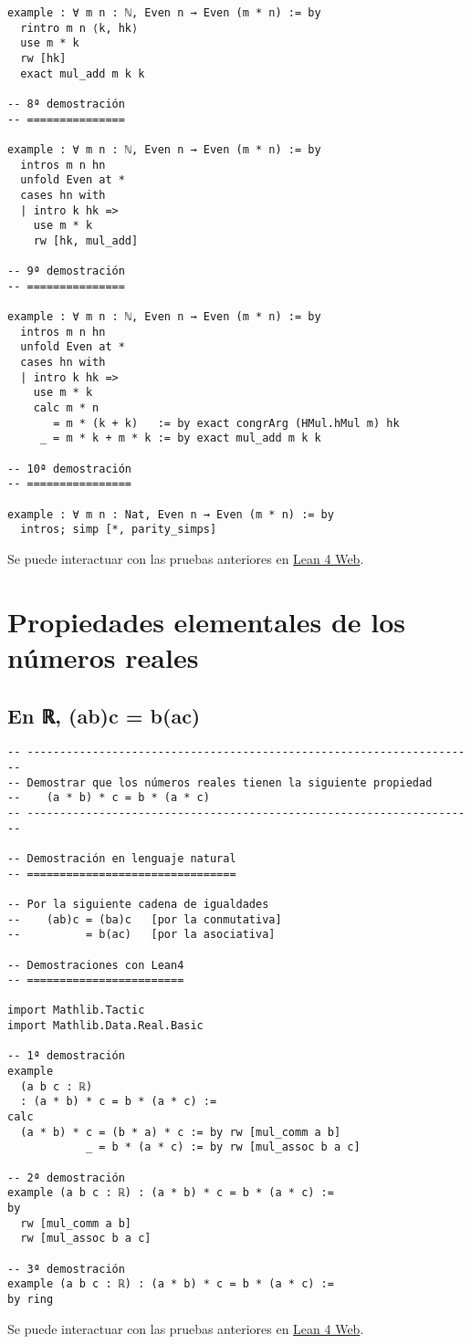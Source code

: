 \begin{verbatim}
example : ∀ m n : ℕ, Even n → Even (m * n) := by
  rintro m n ⟨k, hk⟩
  use m * k
  rw [hk]
  exact mul_add m k k

-- 8ª demostración
-- ===============

example : ∀ m n : ℕ, Even n → Even (m * n) := by
  intros m n hn
  unfold Even at *
  cases hn with
  | intro k hk =>
    use m * k
    rw [hk, mul_add]

-- 9ª demostración
-- ===============

example : ∀ m n : ℕ, Even n → Even (m * n) := by
  intros m n hn
  unfold Even at *
  cases hn with
  | intro k hk =>
    use m * k
    calc m * n
       = m * (k + k)   := by exact congrArg (HMul.hMul m) hk
     _ = m * k + m * k := by exact mul_add m k k

-- 10ª demostración
-- ================

example : ∀ m n : Nat, Even n → Even (m * n) := by
  intros; simp [*, parity_simps]
\end{verbatim}
Se puede interactuar con las pruebas anteriores en \href{https://lean.math.hhu.de/\#url=https://raw.githubusercontent.com/jaalonso/Calculemus2/main/src/El\_producto\_por\_un\_par\_es\_par.lean}{Lean 4 Web}.

\chapter{Propiedades elementales de los números reales}
\label{sec:org77143f1}

\section{En ℝ, (ab)c = b(ac)}
\label{sec:org074cb82}
\begin{verbatim}
-- ---------------------------------------------------------------------
-- Demostrar que los números reales tienen la siguiente propiedad
--    (a * b) * c = b * (a * c)
-- ---------------------------------------------------------------------

-- Demostración en lenguaje natural
-- ================================

-- Por la siguiente cadena de igualdades
--    (ab)c = (ba)c   [por la conmutativa]
--          = b(ac)   [por la asociativa]

-- Demostraciones con Lean4
-- ========================

import Mathlib.Tactic
import Mathlib.Data.Real.Basic

-- 1ª demostración
example
  (a b c : ℝ)
  : (a * b) * c = b * (a * c) :=
calc
  (a * b) * c = (b * a) * c := by rw [mul_comm a b]
            _ = b * (a * c) := by rw [mul_assoc b a c]

-- 2ª demostración
example (a b c : ℝ) : (a * b) * c = b * (a * c) :=
by
  rw [mul_comm a b]
  rw [mul_assoc b a c]

-- 3ª demostración
example (a b c : ℝ) : (a * b) * c = b * (a * c) :=
by ring
\end{verbatim}
Se puede interactuar con las pruebas anteriores en \href{https://lean.math.hhu.de/\#url=https://raw.githubusercontent.com/jaalonso/Calculemus2/main/src/Asociativa\_conmutativa\_de\_los\_reales.lean}{Lean 4 Web}.

